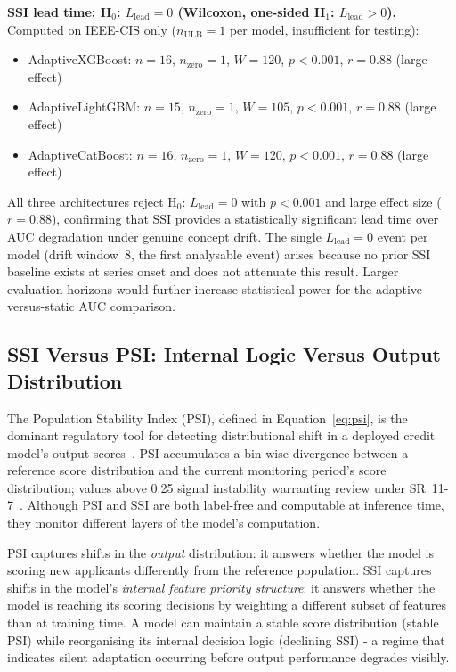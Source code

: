 \documentclass[pdflatex,sn-mathphys-num]{sn-jnl}
\theoremstyle{thmstyleone}
\theoremstyle{thmstyletwo}
\theoremstyle{thmstylethree}
\begin{document}
\textbf{SSI lead time: H$_0$: $L_{\mathrm{lead}} = 0$ (Wilcoxon, one-sided
H$_1$: $L_{\mathrm{lead}} > 0$).} Computed on IEEE-CIS only ($n_{\mathrm{ULB}} = 1$
per model, insufficient for testing):
\begin{itemize}
  \item AdaptiveXGBoost: $n=16$, $n_{\mathrm{zero}}=1$,
        $W=120$, $p{<}0.001$, $r=0.88$ (large effect)
  \item AdaptiveLightGBM: $n=15$, $n_{\mathrm{zero}}=1$,
        $W=105$, $p{<}0.001$, $r=0.88$ (large effect)
  \item AdaptiveCatBoost: $n=16$, $n_{\mathrm{zero}}=1$,
        $W=120$, $p{<}0.001$, $r=0.88$ (large effect)
\end{itemize}
All three architectures reject H$_0$: $L_{\mathrm{lead}} = 0$ with $p{<}0.001$ and
large effect size ($r=0.88$), confirming that SSI provides a statistically
significant lead time over AUC degradation under genuine concept drift. The
single $L_{\mathrm{lead}}=0$ event per model (drift window~8, the first analysable
event) arises because no prior SSI baseline exists at series onset and does
not attenuate this result. Larger evaluation horizons would further increase
statistical power for the adaptive-versus-static AUC comparison.

\subsection{SSI Versus PSI: Internal Logic Versus Output Distribution}
\label{sec:res:psi}

The Population Stability Index (PSI), defined in Equation~\eqref{eq:psi}, is
the dominant regulatory tool for detecting distributional shift in a deployed
credit model's output scores~\cite{siddiqi2006scorecard}. PSI accumulates a
bin-wise divergence between a reference score distribution and the current
monitoring period's score distribution; values above 0.25 signal instability
warranting review under SR~11-7~\cite{sr117_2011}. Although PSI and SSI are
both label-free and computable at inference time, they monitor different layers
of the model's computation.

PSI captures shifts in the \emph{output} distribution: it answers whether the
model is scoring new applicants differently from the reference population. SSI
captures shifts in the model's \emph{internal feature priority structure}: it
answers whether the model is reaching its scoring decisions by weighting a
different subset of features than at training time. A model can maintain a
stable score distribution (stable PSI) while reorganising its internal decision
logic (declining SSI) - a regime that indicates silent adaptation occurring
before output performance degrades visibly.
\end{document}

